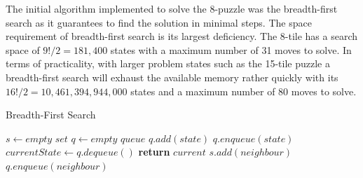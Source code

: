 \documentclass[final]{cmpreport}
\begin{document}
The initial algorithm implemented to solve the 8-puzzle was the breadth-first search as it guarantees to find the solution in minimal steps. The space requirement of breadth-first search is its largest deficiency. The 8-tile has a search space of $9!/2=181,400$ states with a maximum number of 31 moves to solve. In terms of practicality, with larger problem states such as the 15-tile puzzle a breadth-first search will exhaust the available memory rather quickly with its $16!/2 = 10,461,394,944,000$ states and a maximum number of 80 moves to solve.
	\begin{algorithm}
	\caption{Breadth-First Search}\label{BFS}
	\begin{algorithmic}[1]
		\State $s \gets \textit{empty set}$
		\State $q \gets \textit{empty queue}$
		\State $q.add(state)$
		\State $q.enqueue(state)$
		\State $currentState \gets q.dequeue()$
		\State \textbf{return} $current$
		\EndIf
		\State $s.add(neighbour)$
		\State $q.enqueue(neighbour)$
		\EndIf
		
		\EndFor
		\EndWhile
		\EndProcedure
	\end{algorithmic}
\end{algorithm}
\end{document}
